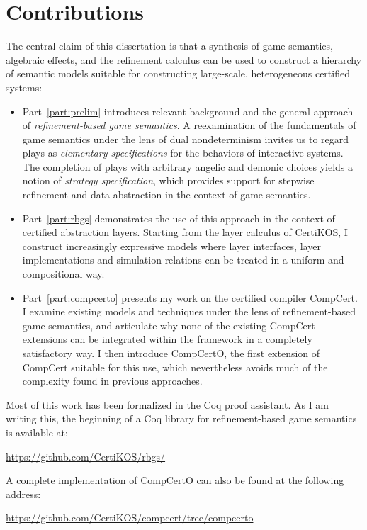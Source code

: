 \documentclass[11pt,oneside,draft]{book}
\theoremstyle{definition}
\begin{document}

\section{Contributions} %
\label{ssec:contrib}

The central claim of this dissertation is that a synthesis
of %
game semantics, algebraic effects, and the refinement calculus
can be used to construct a hierarchy of semantic models
suitable for constructing large-scale, heterogeneous certified systems:
\begin{itemize}
  \item
    Part~\ref{part:prelim} introduces relevant background
    and the general approach of
    \emph{refinement-based game semantics}.
    A reexamination of the fundamentals of game semantics
    under the lens of dual nondeterminism
    invites us to regard plays as \emph{elementary specifications}
    for the behaviors of interactive systems.
    The completion of plays
    with arbitrary angelic and demonic choices
    yields a notion of \emph{strategy specification},
    which provides support for
    stepwise refinement and data abstraction
    in the context of game semantics.
  \item
    Part~\ref{part:rbgs} demonstrates the use of this approach
    in the context of certified abstraction layers.
    Starting from the layer calculus of CertiKOS,
    I construct increasingly expressive models
    where layer interfaces, layer implementations and
    simulation relations
    can be treated in a uniform and compositional way.
  \item
    Part~\ref{part:compcerto}
    presents my work on the certified compiler CompCert.
    I examine existing models and techniques
    under the lens of refinement-based game semantics,
    and articulate why none of the existing
    CompCert extensions can be integrated within
    the framework in a completely satisfactory way.
    I then introduce CompCertO,
    the first extension of CompCert suitable
    for this use,
    which nevertheless avoids much of the complexity
    found in previous approaches.
\end{itemize}

Most of this work has been formalized in the Coq proof assistant.
As I am writing this,
the beginning of a Coq library
for refinement-based game semantics
is available at:
\begin{center}
  \url{https://github.com/CertiKOS/rbgs/}
\end{center}
A complete implementation of CompCertO
can also be found at the following address:
\begin{center}
  \url{https://github.com/CertiKOS/compcert/tree/compcerto}
\end{center}
\end{document}
